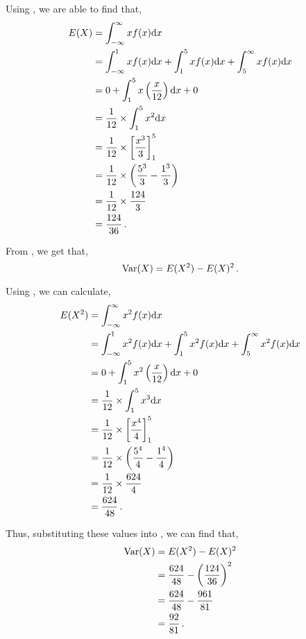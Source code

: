 \begin{subquestions}

\subquestion

Using , we are able to find that,
\begin{align}
	E(X) & = \int_{-\infty}^{\infty} xf(x)\mathrm{d}x \nonumber \\
		 & = \int_{-\infty}^{1} xf(x)\mathrm{d}x + \int_{1}^{5} xf(x)\mathrm{d}x + \int_{5}^{\infty} xf(x)\mathrm{d}x \nonumber \\
		 & = 0 + \int_{1}^{5} x\left( \frac{x}{12}\right)\mathrm{d}x + 0\nonumber \\
		 & = \frac{1}{12} \times \int_{1}^{5} x^2\mathrm{d}x \nonumber \\ 
		 & = \frac{1}{12} \times \left[\frac{x^3}{3}\right]^5_1 \nonumber \\
		 & = \frac{1}{12} \times \left(\frac{5^3}{3}-\frac{1^3}{3}\right) \nonumber \\
		 & = \frac{1}{12} \times \frac{124}{3} \nonumber \\
		 & = \frac{124}{36} \,.
\end{align}

From , we get that,
\begin{equation}
	\text{Var}(X) = E(X^2) - E(X)^2 \,.\label{2008M:q4:CRVar}
\end{equation}

Using , we can calculate,
\begin{align}
	E(X^2) & = \int_{-\infty}^{\infty} x^2f(x)\mathrm{d}x \nonumber \\
	 & = \int_{-\infty}^{1} x^2f(x)\mathrm{d}x+\int_{1}^{5} x^2f(x)\mathrm{d}x+\int_{5}^{\infty} x^2f(x)\mathrm{d}x \nonumber \\
	& = 0 + \int_{1}^{5} x^2\left( \frac{x}{12}\right)\mathrm{d}x + 0 \nonumber \\
	& = \frac{1}{12} \times \int_{1}^{5} x^3\mathrm{d}x \nonumber \\ 
	& = \frac{1}{12} \times \left[\frac{x^4}{4}\right]^5_1 \nonumber \\
	& = \frac{1}{12} \times \left(\frac{5^4}{4}-\frac{1^4}{4}\right) \nonumber \\
	& = \frac{1}{12} \times \frac{624}{4} \nonumber \\
	& = \frac{624}{48} \,. 
\end{align}

Thus, substituting these values into , we can find that,
\begin{align}
	\text{Var}(X) & = E(X^2) - E(X)^2 \nonumber \\
	& = \frac{624}{48} - \left(\frac{124}{36}\right)^2 \nonumber \\
	& = \frac{624}{48}-\frac{961}{81} \nonumber \\
	& = \frac{92}{81} \,.
\end{align}


\end{subquestions}
